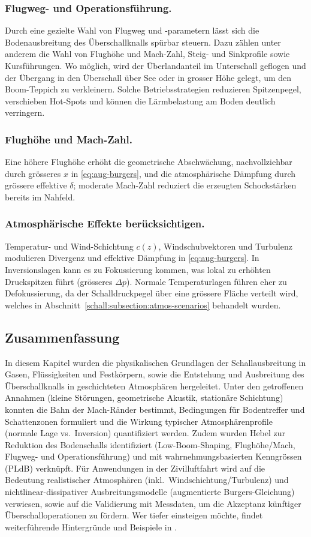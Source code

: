 \subsubsection{Flugweg- und Operationsführung.}
Durch eine gezielte Wahl von Flugweg und -parametern lässt sich die
Bodenausbreitung des Überschallknalls spürbar steuern.
Dazu zählen unter anderem die Wahl von Flughöhe und Mach-Zahl, Steig-
und Sinkprofile sowie Kursführungen.
Wo möglich, wird der Überlandanteil im Unterschall geflogen und der
Übergang in den Überschall über See oder in grosser Höhe gelegt,
um den Boom-Teppich zu verkleinern.
Solche Betriebsstrategien reduzieren Spitzenpegel, verschieben Hot-Spots
und können die Lärmbelastung am Boden deutlich verringern.

\subsubsection{Flughöhe und Mach-Zahl.}
Eine höhere Flughöhe erhöht die geometrische Abschwächung, nachvollziehbar durch
grösseres $x$ in \eqref{eq:aug-burgers}, und die atmosphärische Dämpfung durch
grössere effektive $\delta$; moderate Mach-Zahl reduziert die erzeugten
Schockstärken bereits im Nahfeld.

\subsubsection{Atmosphärische Effekte berücksichtigen.}
Temperatur- und Wind-Schichtung $c(z)$, Windschubvektoren und Turbulenz
modulieren Divergenz und effektive Dämpfung in \eqref{eq:aug-burgers}.
In Inversionslagen kann es zu Fokussierung kommen, was lokal
zu erhöhten Druckspitzen führt (grösseres $\Delta p$).
Normale Temperaturlagen führen eher zu Defokussierung,
da der Schalldruckpegel über eine grössere Fläche verteilt wird,
welches in Abschnitt~\ref{schall:subsection:atmos-scenarios} behandelt wurden.

\subsection{Zusammenfassung}
In diesem Kapitel wurden die physikalischen Grundlagen der
Schallausbreitung in Gasen, Flüssigkeiten und Festkörpern, sowie die
Entstehung und Ausbreitung des Überschallknalls in geschichteten
Atmosphären hergeleitet.
Unter den getroffenen Annahmen (kleine Störungen, geometrische Akustik,
stationäre Schichtung) konnten die Bahn der Mach-Ränder bestimmt,
Bedingungen für Bodentreffer und Schattenzonen formuliert und die Wirkung
typischer Atmosphärenprofile (normale Lage vs.~Inversion) quantifiziert werden.
Zudem wurden Hebel zur Reduktion des Bodenschalls identifiziert
(Low-Boom-Shaping, Flughöhe/Mach, Flugweg- und Operationsführung) und mit
wahrnehmungsbasierten Kenngrössen (PLdB) verknüpft.
Für Anwendungen in der Zivilluftfahrt wird auf die Bedeutung
realistischer Atmosphären (inkl.~Windschichtung/Turbulenz) und
nichtlinear-dissipativer Ausbreitungsmodelle
(augmentierte Burgers-Gleichung) verwiesen,
sowie auf die Validierung mit Messdaten, um die Akzeptanz künftiger
Überschalloperationen zu fördern.
Wer tiefer einsteigen möchte, findet weiterführende Hintergründe und
Beispiele in
\cite{schall:darden75, schall:x59pldb, schall:seebassgeorge, schall:whitham, schall:burgersJASA}.
